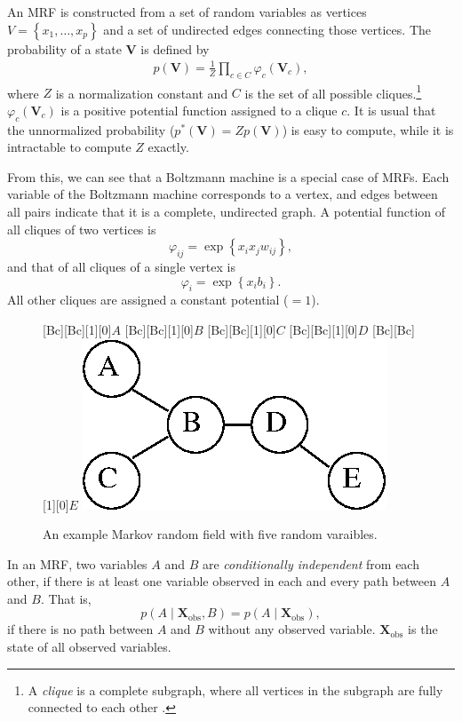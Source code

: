 \documentclass[dissertation,nocontribution]{aaltoseries}
\newcommand{\matr}[1]{\mathbf{#1}}
\newcommand{\mX}[0]{\matr{X}}
\newcommand{\mV}[0]{\matr{V}}
\begin{document}
An MRF is constructed from a set of random variables as
vertices $V=\left\{ x_1, \dots, x_p \right\}$ and a set of
undirected edges connecting those vertices. The probability of
a state $\mV$ is defined by 
\begin{align*}
    p(\mV) = \frac{1}{Z} \prod_{c \in C} \varphi_c
    \left(\mV_c\right),
\end{align*}
where $Z$ is a normalization constant and $C$ is the set of all
possible cliques.\footnote{A \textit{clique} is a complete
subgraph, where all vertices in the subgraph are fully
connected to each other \citep[see, e.g.,][]{Bondy2008}.}
$\varphi_c\left(\mV_c\right)$ is a positive potential
function assigned to a clique $c$. It is usual that the
unnormalized probability ($p^*(\mV) = Z p(\mV)$) is easy to
compute, while it is intractable to compute $Z$ exactly.

From this, we can see that a Boltzmann machine is a special case
of MRFs. Each variable of the Boltzmann machine corresponds to a
vertex, and edges between all pairs indicate that it is a
complete, undirected graph. A potential function of all cliques
of two vertices is
\[
\varphi_{ij} = \exp \left\{ x_i x_j w_{ij} \right\},
\]
and that of all cliques of a single vertex is
\[
\varphi_{i} = \exp \left\{ x_i b_i \right\}.
\]
All other cliques are assigned a constant potential ($=1$).

\begin{figure}[t]
    \centering
    [Bc][Bc][1][0]{$A$}
    [Bc][Bc][1][0]{$B$}
    [Bc][Bc][1][0]{$C$}
    [Bc][Bc][1][0]{$D$}
    [Bc][Bc][1][0]{$E$}
    \includegraphics[width=0.4\columnwidth]{figures/mrf.eps}
    \caption{An example Markov random field with five random
    varaibles.}
    \label{fig:mrf}
\end{figure}


In an MRF, two variables $A$ and $B$ are
\textit{conditionally independent} from each other, if there
is at least one variable observed in each and every path
between $A$ and $B$.
That is, 
\[
p(A \mid \mX_{\text{obs}}, B) = p(A \mid \mX_{\text{obs}}),
\]
if there is no path between $A$ and $B$ without any observed
variable. $\mX_{\text{obs}}$ is the state of all observed
variables.
\end{document}
